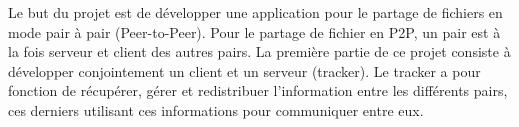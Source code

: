 Le but du projet est de développer une application pour le partage de fichiers en mode pair à pair (Peer-to-Peer). Pour le partage de fichier en P2P, un pair est à la fois serveur et client des autres pairs. La première partie de ce projet consiste à développer conjointement un client et un serveur (tracker). Le tracker a pour fonction de récupérer, gérer et redistribuer l'information entre les différents pairs, ces derniers utilisant ces informations pour communiquer entre eux. 
